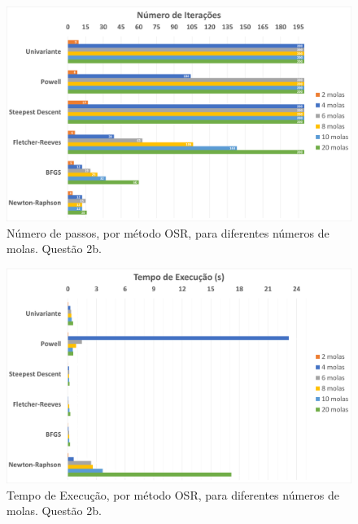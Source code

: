 \documentclass[10pt, a4paper]{article}
\begin{document}
\begin{figure}[H]
  \centering
  \includegraphics[scale=0.4]{figuras/q2b_passos.png}
  \caption{Número de passos, por método OSR, para diferentes números de molas. Questão 2b.}
\end{figure}

\begin{figure}[H]
  \centering
  \includegraphics[scale=0.4]{figuras/q2b_tempo.png}
  \caption{Tempo de Execução, por método OSR, para diferentes números de molas. Questão 2b.}
\end{figure}
\end{document}
